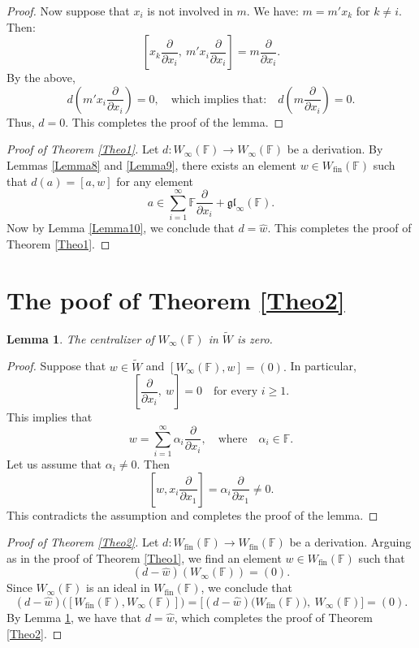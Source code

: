 \documentclass[12pt,a4paper]{amsart}
\theoremstyle{plain}
\newtheorem{Lemma}{Lemma}
\begin{document}
\begin{proof}
		Now suppose that \( x_i \) is not involved in \( m \).  We have: $ m = m' x_k$ for $k\not= i.$ 
		Then:
		\[
		\left[x_k \frac{\partial}{\partial x_i},\ m' x_i \frac{\partial}{\partial x_i}\right]
		= m \frac{\partial}{\partial x_i}.
		\]
		By the above,
		\[
		d\left(m' x_i \frac{\partial}{\partial x_i}\right)= 0, \quad \text{which implies that:} \quad 
		d\left(m \frac{\partial}{\partial x_i}\right) = 0.
		\]
		Thus,  \( d = 0 \). This completes the proof of the lemma. \end{proof}
	
	
	
	\begin{proof}[Proof of Theorem \ref{Theo1}]
		Let \( d: W_\infty(\mathbb{F}) \to W_\infty(\mathbb{F}) \) be a derivation.  
		By Lemmas \ref{Lemma8} and \ref{Lemma9}, there exists an element \( w \in W_{\mathrm{fin}}(\mathbb{F}) \) such that 
		$d(a) = [a, w]$  for any element $$ a \in \sum_{i=1}^\infty \mathbb{F}  \frac{\partial}{\partial x_i} + \mathfrak{gl}_\infty(\mathbb{F}).$$ Now by Lemma \ref{Lemma10}, we conclude that \( d = \hat{w} \).  
		This completes the proof of Theorem \ref{Theo1}. \end{proof}
	
	
	
	\section{The poof of Theorem \ref{Theo2}}
	
	\begin{Lemma}\label{Lemma11} The centralizer of \( W_\infty(\mathbb{F}) \) in \( \widetilde{W} \) is zero. \end{Lemma}
	
	\begin{proof} Suppose that \( w \in \widetilde{W} \) and $[W_\infty(\mathbb{F}), w] = (0).$ 
		In particular,
		\[
		\left[ \frac{\partial}{\partial x_i},\ w\right] = 0 \quad \text{for every } i \geq 1.
		\]
		This implies that 
		\[
		w = \sum_{i=1}^\infty \alpha_i \frac{\partial}{\partial x_i}, \quad \text{where} \quad \alpha_i \in \mathbb{F}.
		\]
		Let us assume that \( \alpha_i \neq 0 \). Then
		\[
		[w, x_i \frac{\partial}{\partial x_1}] = \alpha_i \frac{\partial}{\partial x_1}  \neq 0.
		\]
		This contradicts the assumption and completes the proof of the lemma. \end{proof}
	
	
	
	\begin{proof}[Proof of Theorem \ref{Theo2}] Let \( d : W_{\mathrm{fin}}(\mathbb{F}) \to W_{\mathrm{fin}}(\mathbb{F}) \) be a derivation. Arguing as in the proof of Theorem \ref{Theo1}, we find an element \( w \in W_{\text{fin}}(\mathbb{F}) \) such that  
		\[
		(d - \hat{w})(W_{\infty}(\mathbb{F})) = (0).
		\]
		Since \( W_{\infty}(\mathbb{F}) \) is an ideal in \( W_{\text{fin}}(\mathbb{F}) \), we conclude that
		\[
		(d - \hat{w})\Big([W_{\text{fin}}(\mathbb{F}), W_{\infty}(\mathbb{F})]\Big) = \Big[(d - \hat{w}) \big( W_{\text{fin}}(\mathbb{F})\big), \ W_{\infty}(\mathbb{F}) \Big]= (0).
		\]
		By Lemma \ref{Lemma11},  we have that \( d = \hat{w} \), which completes the proof of  Theorem \ref{Theo2}. \end{proof}
	
\end{document}
